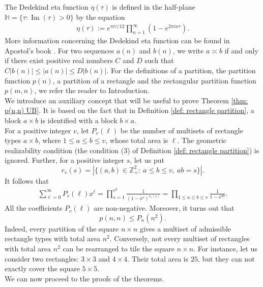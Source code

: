 \documentclass[12pt,a4paper]{amsart}
\numberwithin{equation}{section}
\theoremstyle{plain}
\theoremstyle{definition}
\theoremstyle{remark}
\begin{document}
The Dedekind eta function $\eta(\tau)$ is defined in the half-plane $\mathbb{H}=\{\tau:\operatorname{Im}(\tau)>0\}$ by the equation
\begin{align*}
    \eta(\tau):=e^{\pi i\tau/12}\prod_{n=1}^\infty\left(1-e^{2\pi in\tau}\right).
\end{align*}
More information concerning the Dedekind eta function can be found in Apostol's book \cite[Chapter 3]{ApostolModularFunctions}. For two sequences $a(n)$ and $b(n)$, we write $a\asymp b$ if and only if there exist positive real numbers $C$ and $D$ such that $C|b(n)|\le  |a(n)|\le  D|b(n)|$. For the definitions of a partition, the partition function $p(n)$, a partition of a rectangle and the rectangular partition function $p(m,n)$, we refer the reader to Introduction.\\
We introduce an auxiliary concept that will be useful to prove Theorem \ref{thm: p(n,n) UB}. It is based on the fact that in Definition \ref{def: rectangle partition}, a block $a\times b$ is identified with a block $b\times a$.\\
For a positive integer $v$, let $P_v(\ell)$ be the number of multisets of rectangle types $a\times b$, where $1\le a\le b\le v$, whose total area is $\ell$. The geometric realizability condition (the condition (3) of Definition \ref{def: rectangle partition}) is ignored. Further, for a positive integer $s$, let us put 
$$r_v(s)=|\{(a,b)\in\mathbb{Z}_+^2:\ a\le b\le v,\ ab=s\}|.$$
It follows that
\begin{align}\label{def: generating P_v(n)}
\sum_{\ell=0}^\infty P_v(\ell)x^\ell=\prod_{s=1}^{v^2}\frac{1}{(1-x^s)^{r_v(s)}}=\prod_{1\le a\le b\le v}\frac{1}{1-x^{ab}}.    
\end{align}
All the coefficients $P_v(\ell)$ are non-negative. Moreover, it turns out that 
\begin{equation}\label{ineq:pnn-Pn}
p(n,n)\le P_n(n^2).
\end{equation} 
Indeed, every partition of the square $n\times n$ gives a multiset of admissible rectangle types with total area $n^2$. Conversely, not every multiset of rectangles with total area $n^2$ can be rearranged to tile the square $n\times n$.
For instance, let us consider two rectangles: $3\times3$ and $4\times 4$. Their total area is $25$, but they can not exactly cover the square $5\times5$.\\
We can now proceed to the proofs of the theorems.
\end{document}

